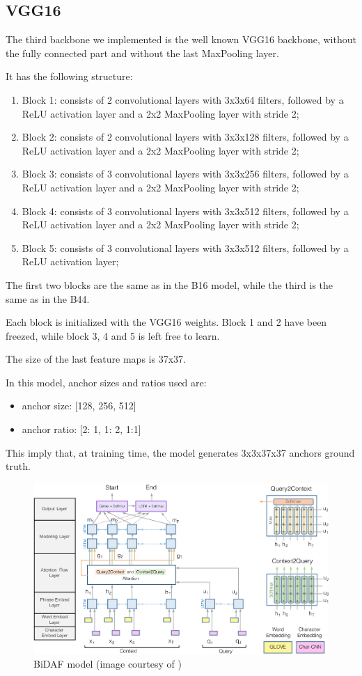 \documentclass[a4paper,10pt]{report}
\begin{document}
\subsection{VGG16}\label{subsec:vgg16}
The third backbone we implemented is the well known VGG16 backbone, without the fully connected part and without the last MaxPooling layer.

It has the following structure:
\begin{enumerate}
  \item Block 1: consists of 2 convolutional layers with 3x3x64 filters, followed by a ReLU activation layer and a 2x2 MaxPooling layer with stride 2;
  \item Block 2: consists of 2 convolutional layers with 3x3x128 filters, followed by a ReLU activation layer and a 2x2 MaxPooling layer with stride 2;
  \item Block 3: consists of 3 convolutional layers with 3x3x256 filters, followed by a ReLU activation layer and a 2x2 MaxPooling layer with stride 2;
  \item Block 4: consists of 3 convolutional layers with 3x3x512 filters, followed by a ReLU activation layer and a 2x2 MaxPooling layer with stride 2;
  \item Block 5: consists of 3 convolutional layers with 3x3x512 filters, followed by a ReLU activation layer;
\end{enumerate}
The first two blocks are the same as in the B16 model, while the third is the same as in the B44.

Each block is initialized with the VGG16 weights. Block 1 and 2 have been freezed, while block 3, 4 and 5 is left free to learn.

The size of the last feature maps is 37x37.

In this model, anchor sizes and ratios used are:
\begin{itemize}
  \item anchor size: [128, 256, 512]
  \item anchor ratio: [2: 1, 1: 2, 1:1]
\end{itemize}

This imply that, at training time, the model generates 3x3x37x37 anchors ground truth.

\begin{figure}[h]
  \center
  \includegraphics[width=0.85\linewidth]{bidaf}
  \caption{BiDAF model (image courtesy of \cite{bidaf})}
  \label{fig:bidaf}
\end{figure}
\end{document}
